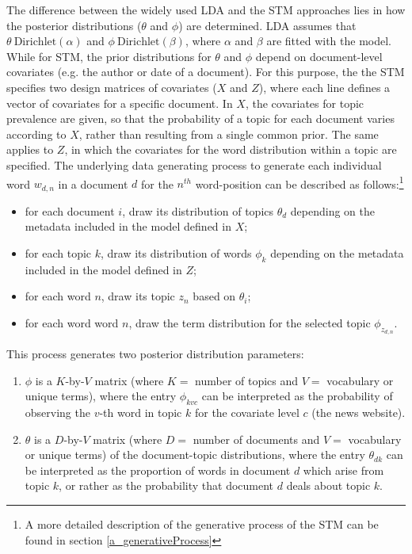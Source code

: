 \documentclass[12pt,a4paper,notitlepage]{article}
\begin{document}
The difference between the widely used LDA and the STM approaches lies in how the posterior distributions ($\theta$ and $\phi$) are determined. LDA assumes that $\theta ~ \text{Dirichlet}(\alpha)$ and $\phi ~ \text{Dirichlet}(\beta)$, where $\alpha$ and $\beta$ are fitted with the model. While for STM, the prior distributions for $\theta$ and $\phi$ depend on document-level covariates (e.g. the author or date of a document). For this purpose, the the STM specifies two design matrices of covariates ($X$ and $Z$), where each line defines a vector of covariates for a specific document. In $X$, the covariates for topic prevalence are given, so that the probability of a topic for each document varies according to $X$, rather than resulting from a single common prior. The same applies to $Z$, in which the covariates for the word distribution within a topic are specified. The underlying data generating process to generate each individual word $w_{d,n}$ in a document $d$ for the $n^{th}$ word-position can be described as follows:\footnote{A more detailed description of the generative process of the STM can be found in section \ref{a_generativeProcess}}

\begin{itemize}
	\item for each document $i$, draw its distribution of topics $\theta_d$ depending on the metadata included in the model defined in $X$; 
	\item for each topic $k$, draw its distribution of words $\phi_k$ depending on the metadata included in the model defined in $Z$;
	\item for each word $n$, draw its topic $z_n$ based on $\theta_i$;
	\item for each word word $n$, draw the term distribution for the selected topic $\phi_{z_{d,n}}$.
\end{itemize}

This process generates two posterior distribution parameters: 

\begin{enumerate}
	\item $\phi$ is a $K$-by-$V$ matrix (where $K=$ number of topics and $V=$ vocabulary or unique terms), where the entry $\phi_{kvc}$ can be interpreted as the probability of observing the $v$-th word in topic $k$ for the covariate level $c$ (the news website). 
	\item $\theta$ is a $D$-by-$V$ matrix (where $D=$ number of documents and $V=$ vocabulary or unique terms) of the document-topic distributions, where the entry $\theta_{dk}$ can be interpreted as the proportion of words in document $d$ which arise from topic $k$, or rather as the probability that document $d$ deals about topic $k$. 
\end{enumerate}
\end{document}
